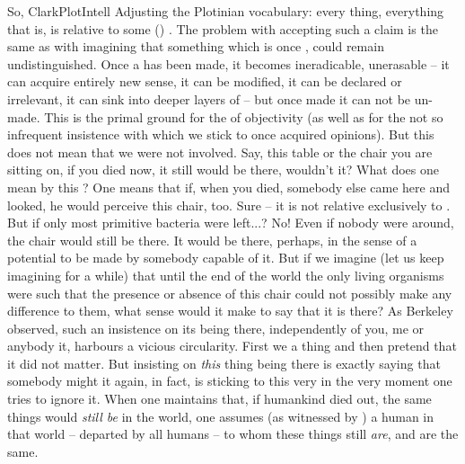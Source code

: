 \pa So, \citet{there can be no things with determinate natures unless there are
  true descriptions, and no true descriptions unless the intellect is already at
  work.}{ClarkPlotIntell}{} Adjusting the Plotinian vocabulary:
every thing, everything that is, is relative to some ()
.  The problem with accepting such a claim is the same as with
imagining that something which is once , could remain
undistinguished.  Once a  has been made, it becomes
ineradicable, unerasable -- it can acquire entirely new sense, it can be
modified, it can be declared  or irrelevant, it can sink into deeper
layers of  -- but once made it can not be un-made. This is the
primal ground for the  of objectivity (as well as for the not so
infrequent insistence with which we stick to once acquired opinions). But this
does not mean that we were not involved.  Say, this table or the chair you are
  sitting on, if you died now, it
still would be there, wouldn't it? What does one mean by this ? One
means that if, when you died, somebody else came here and looked, he would
perceive this chair, too. Sure -- it is not relative exclusively to . But if only most primitive bacteria were left...? No! Even if
nobody were around, the chair would still be there. It would be there, perhaps,
in the sense of a potential  to be made by somebody capable of
it. But if we imagine (let us keep imagining for a while) that until the end of
the world the only living organisms were such that the presence or absence of
this chair could not possibly make any difference to them, what sense would it
make to say that it is there?  As Berkeley observed, such an insistence on its
being there, independently of you, me or anybody  it, harbours a
vicious circularity. First we  a thing and then pretend that it
did not matter.  But insisting on {\em this} thing being there is exactly saying
that somebody might  it again, in fact, is sticking to this very
 in the very moment one tries to ignore it.  When one maintains that, if humankind died
out, the same things would  {\em still be} in the world, one assumes (as
  witnessed by ) a human
 in that world -- departed by all humans -- to whom these things
still {\em are}, and are the same.%


